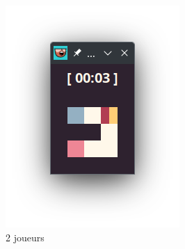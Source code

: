 \begin{figure}[!htb]
\begin{subfigure}[b]{0.2\textwidth}
        \includegraphics[width=\textwidth]{ressources/Implementation/Labyrinthe/Vue/Players/2Players.png}
        \caption{2 joueurs}
    \end{subfigure}
    \hfill
    \begin{subfigure}[b]{0.2\textwidth}

\end{subfigure}
\end{figure}
